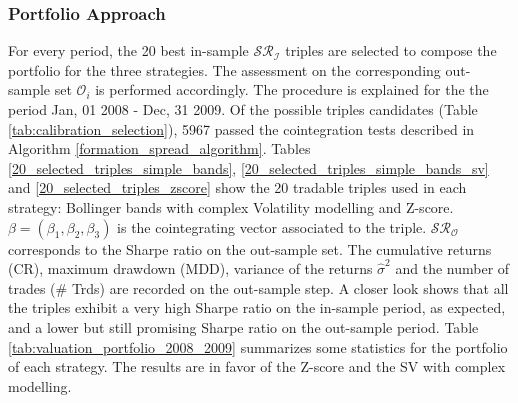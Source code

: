 \documentclass[11pt,a4,twosided,singlespacing,titlepagenumber=on]{scrreprt}
\numberwithin{equation}{chapter} %
\theoremstyle{remark}
\begin{document}
\subsubsection{Portfolio Approach}
For every period, the 20 best in-sample $\mathcal{SR}_\mathcal{I}$ triples are selected to compose the portfolio for the three strategies. The assessment on the corresponding out-sample set $\mathcal{O}_i$ is performed accordingly. The procedure is explained for the the period Jan, 01 2008 - Dec, 31 2009. Of the possible triples candidates (Table \ref{tab:calibration_selection}), 5967 passed the cointegration tests described in Algorithm \ref{formation_spread_algorithm}. Tables \ref{20_selected_triples_simple_bands}, \ref{20_selected_triples_simple_bands_sv} and \ref{20_selected_triples_zscore} show the 20 tradable triples used in each strategy: Bollinger bands with complex Volatility modelling and Z-score. $\beta = (\beta_1, \beta_2, \beta_3)$ is the cointegrating vector associated to the triple. $\mathcal{SR}_\mathcal{O}$ corresponds to the Sharpe ratio on the out-sample set. The cumulative returns (CR), maximum drawdown (MDD), variance of the returns $\hat{\sigma}^2$ and the number of trades (\# Trds) are recorded on the out-sample step. A closer look shows that all the triples exhibit a very high Sharpe ratio on the in-sample period, as expected, and a lower but still promising Sharpe ratio on the out-sample period. Table \ref{tab:valuation_portfolio_2008_2009} summarizes some statistics for the portfolio of each strategy. The results are in favor of the Z-score and the SV with complex modelling.
\end{document}
